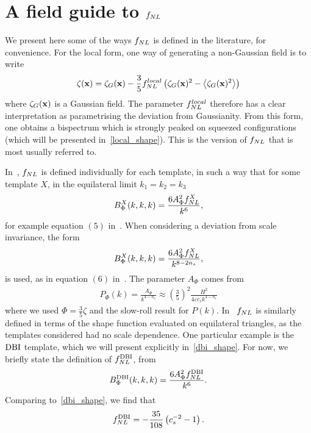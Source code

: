 \section{A field guide to $f_{NL}$}
    We present here some of the ways
    $f_{NL}$ is defined in the literature, for convenience.
    For the local form, one way of generating a non-Gaussian field
    is to write
    \begin{align}\label{fnllocal_quadratic}
        \zeta(\mathbf{x}) = \zeta_G(\mathbf{x}) - \frac{3}{5}f^{local}_{NL}\left(\zeta_G(\mathbf{x})^2-\left<\zeta_G(\mathbf{x})^2\right>\right)
    \end{align}
    where $\zeta_G(\mathbf{x})$ is a Gaussian field. The parameter $f^{local}_{NL}$ therefore has a clear
    interpretation as parametrising the deviation from Gaussianity. From this form,
    one obtains a bispectrum which is strongly peaked on squeezed configurations
    (which will be presented in~\eqref{local_shape}). This is the version of $f_{NL}$
    that is most usually referred to.


    In~\cite{Planck_NG_2013}, $f_{NL}$ is defined individually for each template, in such a way
    that for some template $X$, in the equilateral limit $k_1=k_2=k_3$
    \begin{align}\label{planck_fnl_defn}
        B^X_\Phi(k,k,k) = \frac{6A_\Phi^2f_{NL}^X}{k^6},
    \end{align}
    for example equation $(5)$ in~\cite{Planck_NG_2013}.
    When considering a deviation from scale invariance, the form
    \begin{align}\label{planck_fnl_defn_ns}
        B^X_\Phi(k,k,k) = \frac{6A_\Phi^2f_{NL}^X}{k^{8-2n_s}},
    \end{align}
    is used,
    as in equation $(6)$ in~\cite{Planck_NG_2013}.
    The parameter $A_\Phi$ comes from
    \begin{align}
        P_\Phi(k) = \frac{A_\Phi}{k^{4-n_s}}\approx\left(\frac{3}{5}\right)^2\frac{H^2}{4\varepsilon c_sk^{4-n_s}}
    \end{align}
    where we used $\Phi=\frac{3}{5}\zeta$ and the slow-roll result for $P(k)$.
    In~\cite{seery_ng_0503, chen_ng_0605, dbi_in_the_sky} $f_{NL}$ is similarly defined in terms
    of the shape function evaluated on equilateral triangles,
    as the templates considered had no scale dependence.
    One particular example is the $\text{DBI}$ template, which we will present explicitly in~\eqref{dbi_shape}.
    For now, we briefly state the definition of $f_{NL}^{\text{DBI}}$, from~\cite{Planck_NG_2013}
    \begin{align}
        B^{\text{DBI}}_\Phi(k,k,k) = \frac{6A_\Phi^2f_{NL}^{\text{DBI}}}{k^{6}}.
    \end{align}
    Comparing to~\eqref{dbi_shape}, we find that
    \begin{align}\label{fnl_dbi_defn}
        f_{NL}^{\text{DBI}} = -\frac{35}{108}\left(c_s^{-2}-1\right).
    \end{align}


